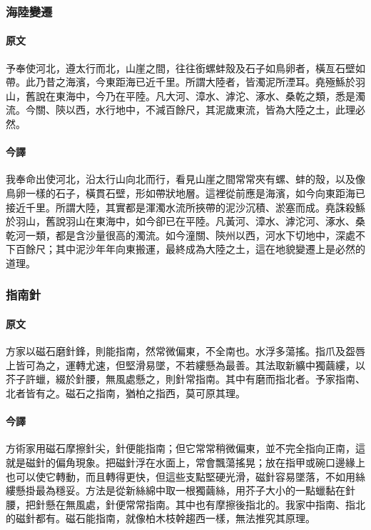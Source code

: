\subsubsection*{海陸變遷}

\paragraph{原文}
予奉使河北，遵太行而北，山崖之間，往往銜螺蚌殼及石子如鳥卵者，橫亙石壁如帶。此乃昔之海濱，今東距海已近千里。所謂大陸者，皆濁泥所湮耳。堯殛鯀於羽山，舊說在東海中，今乃在平陸。凡大河、漳水、滹沱、涿水、桑乾之類，悉是濁流。今關、陝以西，水行地中，不減百餘尺，其泥歲東流，皆為大陸之土，此理必然。

\paragraph{今譯}
我奉命出使河北，沿太行山向北而行，看見山崖之間常常夾有螺、蚌的殼，以及像鳥卵一樣的石子，橫貫石壁，形如帶狀地層。這裡從前應是海濱，如今向東距海已接近千里。所謂大陸，其實都是渾濁水流所挾帶的泥沙沉積、淤塞而成。堯誅殺鯀於羽山，舊說羽山在東海中，如今卻已在平陸。凡黃河、漳水、滹沱河、涿水、桑乾河一類，都是含沙量很高的濁流。如今潼關、陝州以西，河水下切地中，深處不下百餘尺；其中泥沙年年向東搬運，最終成為大陸之土，這在地貌變遷上是必然的道理。

\subsubsection*{指南針}

\paragraph{原文}
方家以磁石磨針鋒，則能指南，然常微偏東，不全南也。水浮多蕩搖。指爪及盌唇上皆可為之，運轉尤速，但堅滑易墜，不若縷懸為最善。其法取新纊中獨繭縷，以芥子許蠟，綴於針腰，無風處懸之，則針常指南。其中有磨而指北者。予家指南、北者皆有之。磁石之指南，猶柏之指西，莫可原其理。

\paragraph{今譯}
方術家用磁石摩擦針尖，針便能指南；但它常常稍微偏東，並不完全指向正南，這就是磁針的偏角現象。把磁針浮在水面上，常會飄蕩搖晃；放在指甲或碗口邊緣上也可以使它轉動，而且轉得更快，但這些支點堅硬光滑，磁針容易墜落，不如用絲縷懸掛最為穩妥。方法是從新絲綿中取一根獨繭絲，用芥子大小的一點蠟黏在針腰，把針懸在無風處，針便常常指南。其中也有摩擦後指北的。我家中指南、指北的磁針都有。磁石能指南，就像柏木枝幹趨西一樣，無法推究其原理。

